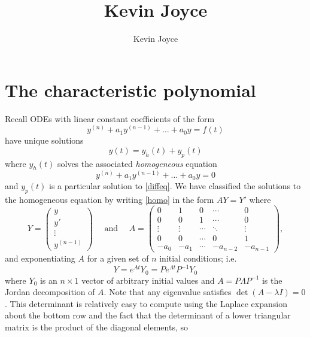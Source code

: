 \documentclass{homework} %
\title{Kevin Joyce}
\author{Kevin Joyce}
\begin{document}
 
\newcommand{\eps}{\varepsilon}
\newcommand{\del}{\partial}

\section{The characteristic polynomial} 

Recall ODEs with linear constant coefficients of the form
\begin{equation}
  y^{(n)} + a_1 y^{(n-1)} + \dots + a_0y = f(t) \label{diffeq}
\end{equation}
have unique solutions  
\begin{equation}
  y(t) = y_h(t) + y_p(t)
\end{equation}
where $y_h(t)$ solves the associated \emph{homogeneous} equation
\begin{equation}
  y^{(n)} + a_1 y^{(n-1)} + \dots + a_0y = 0 \label{homo}
\end{equation}
and $y_p(t)$ is a particular solution to \eqref{diffeq}.  We have classified the solutions to the homogeneous equation by writing \eqref{homo} in the form $AY = Y'$ where 
$$
  Y = \begin{pmatrix}
    y\\
    y'\\
    \vdots \\
    y^{(n-1)}
  \end{pmatrix}
  \quad\text{ and }\quad
  A = \begin{pmatrix}
    0 & 1 & 0 & \cdots & 0 \\
    0 & 0 & 1 & \cdots & 0 \\
    \vdots & \vdots & \cdots & \ddots & \vdots \\
    0 & 0 & \cdots & 0 & 1\\
    -a_0 & -a_1 & \cdots & -a_{n-2} & -a_{n-1}
  \end{pmatrix},
$$
and exponentiating $A$ for a given set of $n$ initial conditions; i.e. 
\begin{equation}
  Y = e^{At} Y_0 = P e^{\Lambda t} P^{-1} Y_0 \label{solution}
\end{equation} 
where $Y_0$ is an $n\times 1$ vector of arbitrary initial values and $A = P\Lambda P^{-1}$ is the Jordan decomposition of $A$.  Note that any eigenvalue satisfies $\det (A - \lambda I) = 0$. This determinant is relatively easy to compute using the Laplace expansion about the bottom row and the fact that the determinant of a lower triangular matrix is the product of the diagonal elements, so
\end{document}
